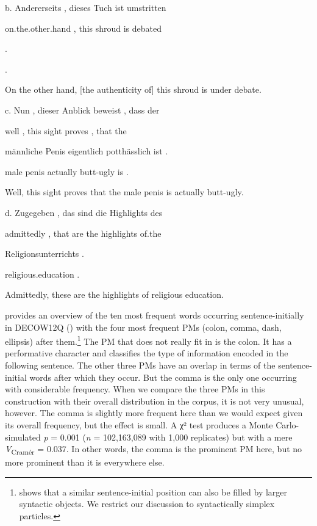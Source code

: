 b.  Andererseits  ,  dieses  Tuch    ist  umstritten



on.the.other.hand  ,  this    shroud  is  debated



.



.



On the other hand, [the authenticity of] this shroud is under debate.



c.  Nun  ,  dieser  Anblick  beweist  ,  dass  der



well  ,  this    sight    proves  ,  that  the



männliche  Penis  eigentlich  potthässlich  ist  .



male    penis  actually  butt-ugly    is  .



Well, this sight proves that the male penis is actually butt-ugly.



d.  Zugegeben  ,  das  sind  die  Highlights  des



admittedly  ,  that  are  the  highlights  of.the



Religionsunterrichts  .



religious.education  .



Admittedly, these are the highlights of religious education.



 provides an overview of the ten most frequent words occurring sentence-initially in DECOW12Q () with the four most frequent PMs (colon, comma, dash, ellipsis) after them.\footnote{\citet{Imo2012} shows that a similar sentence-initial position can also be filled by larger syntactic objects. We restrict our discussion to syntactically simplex particles.} The PM that does not really fit in is the colon. It has a performative character and classifies the type of information encoded in the following sentence. The other three PMs have an overlap in terms of the sentence-initial words after which they occur. But the comma is the only one occurring with considerable frequency. When we compare the three PMs in this construction with their overall distribution in the corpus, it is not very unusual, however. The comma is slightly more frequent here than we would expect given its overall frequency, but the effect is small. A χ² test produces a Monte Carlo-simulated \textit{p} = 0.001 (\textit{n} = 102,163,089 with 1,000 replicates) but with a mere \textit{V}\textsubscript{Cramér} = 0.037. In other words, the comma is the prominent PM here, but no more prominent than it is everywhere else.




